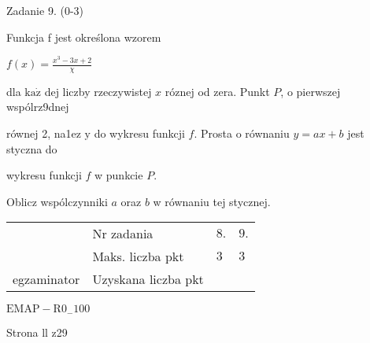 \documentclass[a4paper,12pt]{article}
\begin{document}
Zadanie 9. (0-3)

Funkcja f jest określona wzorem

$f(x)=\displaystyle \frac{x^{3}-3x+2}{\chi}$

dla $\mathrm{k}\mathrm{a}\dot{\mathrm{z}}$ dej liczby rzeczywistej $x$ róznej od zera. Punkt $P$, o pierwszej wspólrz9dnej

równej 2, na1ez $\mathrm{y}$ do wykresu funkcji $f$. Prosta o równaniu $y=ax+b$ jest styczna do

wykresu funkcji $f$ w punkcie $P.$

Oblicz wspólczynniki $a$ oraz $b$ w równaniu tej stycznej.
\begin{center}
\begin{tabular}{|l|l|l|l|}
\cline{2-4}
&	\multicolumn{1}{|l|}{Nr zadania}&	\multicolumn{1}{|l|}{$8.$}&	\multicolumn{1}{|l|}{ $9.$}	\\
\cline{2-4}
&	\multicolumn{1}{|l|}{Maks. liczba pkt}&	\multicolumn{1}{|l|}{$3$}&	\multicolumn{1}{|l|}{ $3$}	\\
\cline{2-4}
\multicolumn{1}{|l|}{egzaminator}&	\multicolumn{1}{|l|}{Uzyskana liczba pkt}&	\multicolumn{1}{|l|}{}&	\multicolumn{1}{|l|}{}	\\
\hline
\end{tabular}

\end{center}
$\mathrm{E}\mathrm{M}\mathrm{A}\mathrm{P}-\mathrm{R}0_{-}100$

Strona ll z29
\end{document}
